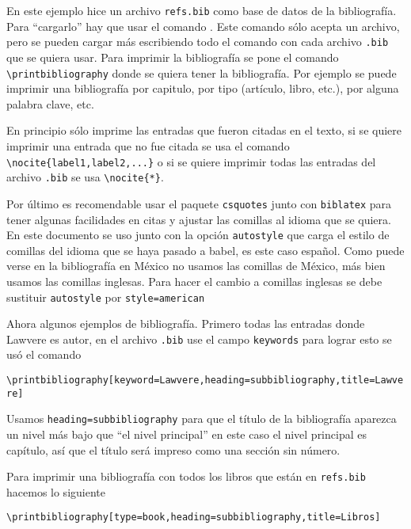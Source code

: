 En este ejemplo hice un archivo \texttt{refs.bib} como base de datos de la
bibliografía. Para ``cargarlo'' hay que usar el comando
\verb||. Este comando sólo acepta un archivo, pero
se pueden cargar más escribiendo todo el comando con cada archivo
\texttt{.bib} que se quiera usar. Para imprimir la bibliografía se pone el
comando \verb|\printbibliography| donde se quiera tener la bibliografía. Por
ejemplo se puede imprimir una bibliografía por capitulo, por tipo
(artículo, libro, etc.), por alguna palabra clave, etc.

En principio sólo imprime las entradas que fueron citadas en el texto, si se
quiere imprimir una entrada que no fue citada se usa el comando
\verb|\nocite{label1,label2,...}| o si se quiere imprimir todas las entradas
del archivo \texttt{.bib} se usa \verb|\nocite{*}|.

Por último es recomendable usar el paquete \texttt{csquotes} junto con
\texttt{biblatex} para tener algunas facilidades en citas y ajustar las
comillas al idioma que se quiera. En este documento se uso junto con la
opción \texttt{autostyle} que carga el estilo de comillas del idioma que se
haya pasado a babel, es este caso español. Como puede verse en la
bibliografía en México no usamos las comillas de México, más bien usamos las
comillas inglesas. Para hacer el cambio a comillas inglesas se debe
sustituir \texttt{autostyle} por \texttt{style=american}

Ahora algunos ejemplos de bibliografía. Primero todas las entradas donde
Lawvere es autor, en el archivo \texttt{.bib} use el campo \texttt{keywords}
para lograr esto se usó el comando
\begin{flushleft}
  \verb|\printbibliography[keyword=Lawvere,heading=subbibliography,title=Lawvere]|
\end{flushleft}
\printbibliography[keyword=Lawvere,heading=subbibliography,title=Lawvere]

Usamos \texttt{heading=subbibliography} para que el título de la bibliografía
aparezca un nivel más bajo que ``el nivel principal'' en este caso el nivel
principal es capítulo, así que el título será impreso como una sección sin
número.

Para imprimir una bibliografía con todos los libros que están en
\texttt{refs.bib} hacemos lo siguiente
\begin{flushleft}
  \verb|\printbibliography[type=book,heading=subbibliography,title=Libros]|
\end{flushleft}
\printbibliography[type=book,heading=subbibliography,title=Libros]

